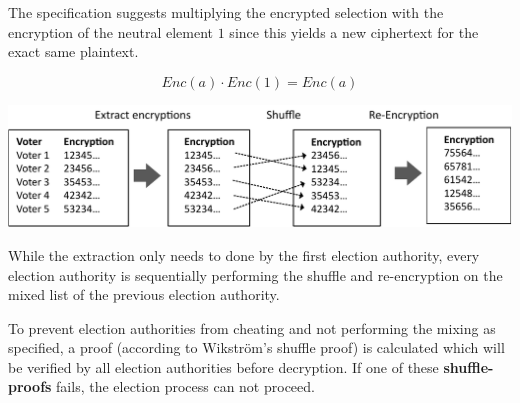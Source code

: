The specification suggests multiplying the encrypted selection with the encryption of the neutral element $1$ since this yields a new ciphertext for the exact same plaintext.

\begin{equation*}Enc(a) \cdot Enc(1) = Enc(a)\end{equation*}

\begin{center}
\includegraphics[scale=0.95]{assets/mixing.pdf}
\label{During the mixing}%
\end{center}

While the extraction only needs to done by the first election authority, every election authority is sequentially performing the shuffle and re-encryption on the mixed list of the previous election authority.

To prevent election authorities from cheating and not performing the mixing as specified, a proof (according to Wikström’s shuffle proof) is calculated which will be verified by all election authorities before decryption. If one of these \textbf{shuffle-proofs} fails, the election process can not proceed.
